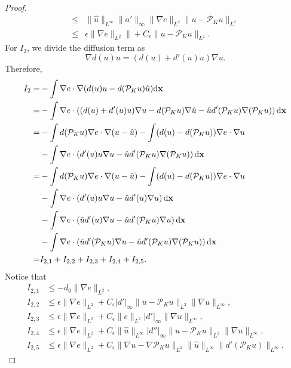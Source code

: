 \documentclass[preprint,12pt]{elsarticle}
\theoremstyle{definition}
\theoremstyle{remark}
\begin{document}
\begin{proof}
\[\begin{aligned}
\leq & \|\hat u \|_{L^\infty} \|a'\|_\infty \|\nabla e \|_{L^2}\|u -\mathcal P_K u \|_{L^2}\\
\leq &  \epsilon \|\nabla e \|_{L^2}\| + C_\epsilon \|u -\mathcal P_K u \|_{L^2}.
\end{aligned}
\]
For $I_2$, we divide the diffusion term as
\[
\nabla d(u)u = (d(u) + d'(u)u)\nabla u.
\]
Therefore, 
\[
\begin{aligned}
    I_2 = &  -\int \nabla e \cdot \nabla  (d(u)u - d(\mathcal P_K u )\hat u  )\mathrm{d} \mathbf{x}\\
     = & -\int \nabla e \cdot \left( (d(u)+d'(u)u)\nabla u - d(\mathcal P_K u) \nabla \hat u - \hat u d'(\mathcal P_K u) \nabla (\mathcal P_K u)  \right)\mathrm{d} \mathbf{x} \\
     = &-\int   d(\mathcal P_K u) \nabla e\cdot \nabla ( u - \hat u ) -  \int (d(u) - d(\mathcal P_K u) ) \nabla e \cdot  \nabla u \\
     & - \int \nabla e \cdot \left(  d'(u)u\nabla u- \hat u d'(\mathcal P_K u) \nabla (\mathcal P_K u)\right)\mathrm{d} \mathbf{x}  \\
    = & -\int   d(\mathcal P_K u) \nabla e\cdot \nabla ( u - \hat u ) -  \int (d(u) - d(\mathcal P_K u) ) \nabla e \cdot  \nabla u \\
     & -  \int \nabla e \cdot \left(  d'(u)u\nabla u- \hat u d'(u) \nabla u \right)\mathrm{d} \mathbf{x}\\
     & -\int \nabla e \cdot \left( \hat u d'(u) \nabla u- \hat u d'(\mathcal P_K u) \nabla u \right)\mathrm{d} \mathbf{x}\\
     & -  \int \nabla e \cdot \left(   \hat u d'(\mathcal P_K u) \nabla u - \hat u d'(\mathcal P_K u) \nabla (\mathcal P_K u)\right)\mathrm{d} \mathbf{x}\\
     =& I_{2,1}+I_{2,2}+I_{2,3}+I_{2,4}+I_{2,5}. 
\end{aligned}
\]
Notice that 
\[
\begin{aligned}
    I_{2,1} &\leq -d_0\|\nabla e \|_{L^2},\\
I_{2,2} &\leq \epsilon \|\nabla e \|_{L^2} +C_\epsilon |d'|_\infty \|u -\mathcal P_K u \|_{L^2} \|\nabla u\|_{L^\infty},\\
I_{2,3} &\leq  \epsilon \|\nabla e \|_{L^2} + C_\epsilon \|e \|_{L^2} |d'|_\infty\|\nabla u\|_{L^\infty},\\
I_{2,4} &\leq  \epsilon \|\nabla e \|_{L^2} + C_\epsilon\|\hat u \|_{L^\infty} |d''|_\infty\|u -\mathcal P_K u \|_{L^2}\|\nabla u\|_{L^\infty},\\
I_{2,5} &\leq  \epsilon \|\nabla e \|_{L^2} + C_\epsilon \|\nabla u -\nabla \mathcal P_K u  \|_{L^2}\|\hat u \|_{L^\infty}\|d'(\mathcal P_K u) \|_{L^\infty}.

\end{aligned}\]
\end{proof}
\end{document}
